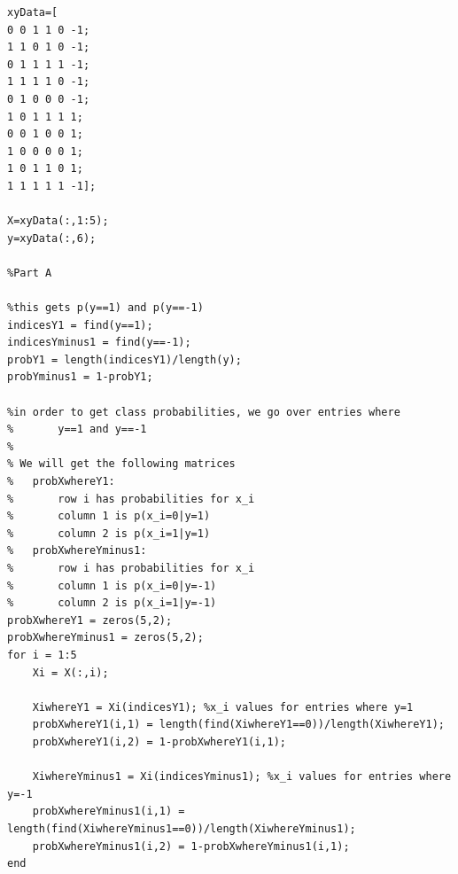 \documentclass[11pt,psfig]{article}
\begin{document}
\begin{verbatim}
xyData=[
0 0 1 1 0 -1;
1 1 0 1 0 -1;
0 1 1 1 1 -1;
1 1 1 1 0 -1;
0 1 0 0 0 -1;
1 0 1 1 1 1;
0 0 1 0 0 1;
1 0 0 0 0 1;
1 0 1 1 0 1;
1 1 1 1 1 -1];   

X=xyData(:,1:5);
y=xyData(:,6);

%Part A

%this gets p(y==1) and p(y==-1)
indicesY1 = find(y==1);
indicesYminus1 = find(y==-1);
probY1 = length(indicesY1)/length(y);
probYminus1 = 1-probY1;

%in order to get class probabilities, we go over entries where
%       y==1 and y==-1
%
% We will get the following matrices
%   probXwhereY1:
%       row i has probabilities for x_i
%       column 1 is p(x_i=0|y=1)
%       column 2 is p(x_i=1|y=1)
%   probXwhereYminus1:
%       row i has probabilities for x_i
%       column 1 is p(x_i=0|y=-1)
%       column 2 is p(x_i=1|y=-1)
probXwhereY1 = zeros(5,2);
probXwhereYminus1 = zeros(5,2);
for i = 1:5
    Xi = X(:,i);
    
    XiwhereY1 = Xi(indicesY1); %x_i values for entries where y=1
    probXwhereY1(i,1) = length(find(XiwhereY1==0))/length(XiwhereY1);
    probXwhereY1(i,2) = 1-probXwhereY1(i,1);
    
    XiwhereYminus1 = Xi(indicesYminus1); %x_i values for entries where y=-1
    probXwhereYminus1(i,1) = length(find(XiwhereYminus1==0))/length(XiwhereYminus1);
    probXwhereYminus1(i,2) = 1-probXwhereYminus1(i,1);
end
\end{verbatim}
\end{document}
